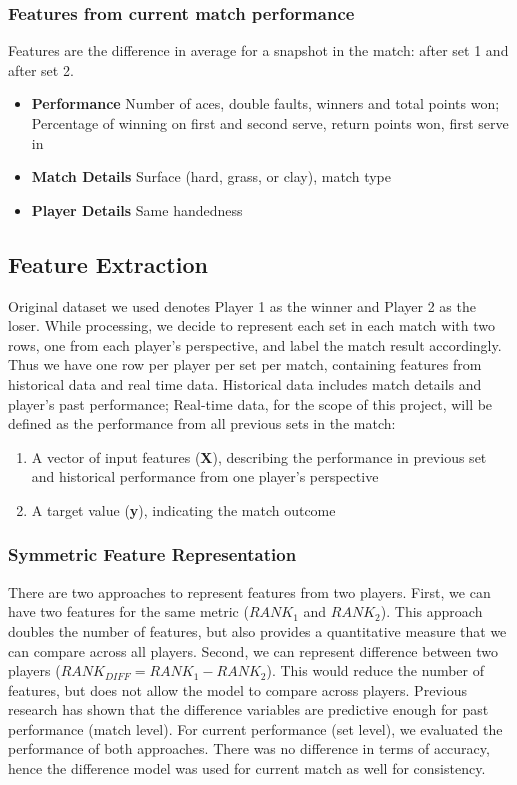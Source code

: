 \documentclass[paper=a4, fontsize=11pt]{scrartcl} %
\numberwithin{equation}{section} %
\numberwithin{figure}{section} %
\numberwithin{table}{section} %
\begin{document}
\subsubsection{Features from current match performance}
Features are the difference in average for a snapshot in the match: after set 1 and after set 2.
\begin{itemize}
\item \textbf{Performance} Number of aces, double faults, winners and total points won; Percentage of winning on first and second serve, return points won, first serve in
\item \textbf{Match Details} Surface (hard, grass, or clay), match type
\item \textbf{Player Details} Same handedness
\end{itemize}
\subsection{Feature Extraction}
\label{sec:label}
Original dataset we used denotes Player 1 as the winner and Player 2 as the loser. While processing, we decide to represent each set in each match with two rows, one from each player's perspective, and label the match result accordingly. Thus we have one row per player per set per match, containing features from historical data and real time data. Historical data includes match details and player's past performance; Real-time data, for the scope of this project, will be defined as the performance from all previous sets in the match:
\begin{enumerate}
\item A vector of input features (\textbf{X}), describing the performance in previous set and historical performance from one player's perspective
\item A target value (\textbf{y}), indicating the match outcome
\end{enumerate}
\subsubsection{Symmetric Feature Representation}
There are two approaches to represent features from two players.  First, we can have two features for the same metric ($RANK_1$ and $RANK_2$).  This approach doubles the number of features, but also provides a quantitative measure that we can compare across all players.  Second, we can represent difference between two players ($RANK_{DIFF} = RANK_1 - RANK_2$).  This would reduce the number of features, but does not allow the model to compare across players.  Previous research has shown that the difference variables are predictive enough \cite{tennis1} \cite{omalley} for past performance (match level).  For current performance (set level), we evaluated the performance of both approaches.  There was no difference in terms of accuracy, hence the difference model was used for current match as well for consistency.
\end{document}
